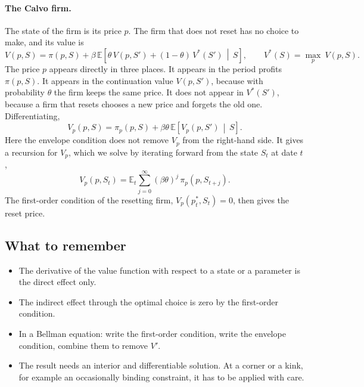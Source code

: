 \documentclass[11pt]{article}
\begin{document}
\paragraph{The Calvo firm.} The state of the firm is its price $p$. The firm that does not reset has no choice to make, and its value is
\begin{equation*}
V(p, S) = \pi(p, S) + \beta\, \mathbb{E} \left[ \theta\, V(p, S') + (1-\theta)\, V^{*}(S') \, \middle| \, S \right] , \qquad V^{*}(S) = \max_{p} \ V(p, S) .
\end{equation*}
The price $p$ appears directly in three places. It appears in the period profits $\pi(p, S)$. It appears in the continuation value $V(p, S')$, because with probability $\theta$ the firm keeps the same price. It does not appear in $V^{*}(S')$, because a firm that resets chooses a new price and forgets the old one. Differentiating,
\begin{equation*}
V_p(p, S) = \pi_p(p, S) + \beta\theta\, \mathbb{E} \left[ V_p(p, S') \, \middle| \, S \right] .
\end{equation*}
Here the envelope condition does not remove $V_p$ from the right-hand side. It gives a recursion for $V_p$, which we solve by iterating forward from the state $S_t$ at date $t$,
\begin{equation*}
V_p(p, S_t) = \mathbb{E}_t \sum_{j=0}^{\infty} (\beta\theta)^{j}\, \pi_p(p, S_{t+j}) .
\end{equation*}
The first-order condition of the resetting firm, $V_p(p_t^{*}, S_t) = 0$, then gives the reset price.

\subsection{What to remember}

\begin{itemize}
\item The derivative of the value function with respect to a state or a parameter is the direct effect only.
\item The indirect effect through the optimal choice is zero by the first-order condition.
\item In a Bellman equation: write the first-order condition, write the envelope condition, combine them to remove $V'$.
\item The result needs an interior and differentiable solution. At a corner or a kink, for example an occasionally binding constraint, it has to be applied with care.
\end{itemize}
\end{document}
